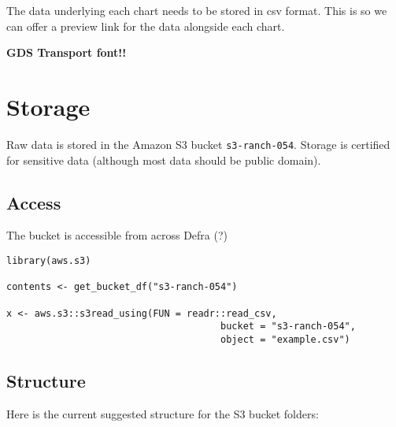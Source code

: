 \documentclass[
]{book}
\begin{document}
The data underlying each chart needs to be stored in csv format. This is so we
can offer a preview link for the data alongside each chart.

\textbf{GDS Transport font!!}

\hypertarget{storage}{%
\section{Storage}\label{storage}}

Raw data is stored in the Amazon S3 bucket \texttt{s3-ranch-054}. Storage is certified
for sensitive data (although most data should be public domain).

\hypertarget{access}{%
\subsection{Access}\label{access}}

The bucket is accessible from across Defra (?)

\begin{verbatim}
library(aws.s3)

contents <- get_bucket_df("s3-ranch-054")

x <- aws.s3::s3read_using(FUN = readr::read_csv,
                                      bucket = "s3-ranch-054",
                                      object = "example.csv")
\end{verbatim}

\hypertarget{structure}{%
\subsection{Structure}\label{structure}}

Here is the current suggested structure for the S3 bucket folders:
\end{document}
